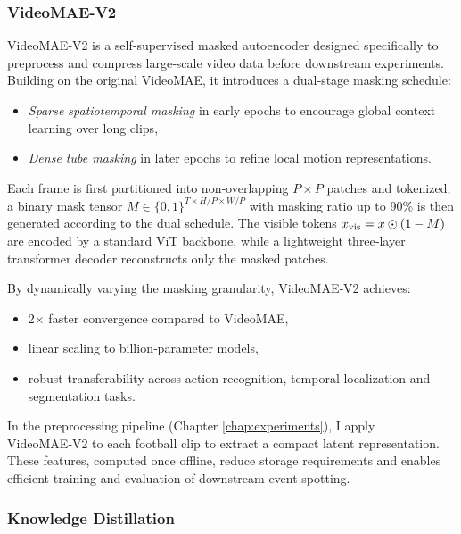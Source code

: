 \subsubsection{VideoMAE-V2}
\label{sssec:videomae_v2}

VideoMAE‑V2 \cite{wang_videomae_2023} is a self‑supervised masked autoencoder designed specifically to preprocess and compress large‑scale video data before downstream experiments. Building on the original VideoMAE, it introduces a dual‑stage masking schedule: 
\begin{itemize}
    \item \emph{Sparse spatiotemporal masking} in early epochs to encourage global context learning over long clips,
    \item \emph{Dense tube masking} in later epochs to refine local motion representations.
\end{itemize}
Each frame is first partitioned into non‑overlapping $P\times P$ patches and tokenized; a binary mask tensor $M\in\{0,1\}^{T\times H/P\times W/P}$ with masking ratio up to 90\% is then generated according to the dual schedule. The visible tokens $x_{\rm vis}=x\odot(1-M)$ are encoded by a standard ViT backbone, while a lightweight three‑layer transformer decoder reconstructs only the masked patches. 

By dynamically varying the masking granularity, VideoMAE‑V2 achieves:
\begin{itemize}
    \item 2× faster convergence compared to VideoMAE,
    \item linear scaling to billion‑parameter models,
    \item robust transferability across action recognition, temporal localization and segmentation tasks.
\end{itemize}

In the preprocessing pipeline (Chapter \ref{chap:experiments}), I apply VideoMAE‑V2 to each football clip to extract a compact latent representation. These features, computed once offline, reduce storage requirements and enables efficient training and evaluation of downstream event‑spotting.


\subsubsection{Knowledge Distillation}
\label{sssec:knowledge_distillation}

